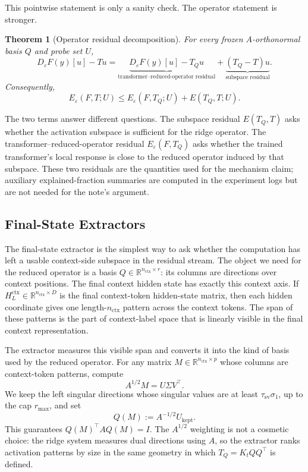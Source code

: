 \documentclass[11pt]{article}
\newtheorem{theorem}{Theorem}
\newcommand{\R}{\mathbb{R}}
\begin{document}
This pointwise statement is only a sanity check. The operator statement is stronger.

\begin{theorem}[Operator residual decomposition]
For every frozen \(A\)-orthonormal basis \(Q\) and probe set \(U\),
\[
D_\varepsilon F(y)[u]-Tu
=
\underbrace{D_\varepsilon F(y)[u]-T_Qu}_{\text{transformer--reduced-operator residual}}
+
\underbrace{(T_Q-T)u}_{\text{subspace residual}}.
\]
Consequently,
\[
E_\varepsilon(F,T;U)
\le
E_\varepsilon(F,T_Q;U)+E(T_Q,T;U).
\]
\end{theorem}

The two terms answer different questions. The subspace residual \(E(T_Q,T)\) asks whether the
activation subspace is sufficient for the ridge operator. The transformer--reduced-operator residual
\(E_\varepsilon(F,T_Q)\) asks whether the trained transformer's local response is close to the reduced
operator induced by that subspace. These two residuals are the quantities used for the mechanism
claim; auxiliary explained-fraction summaries are computed in the experiment logs but are not
needed for the note's argument.

\subsection{Final-State Extractors}

The final-state extractor is the simplest way to ask whether the computation has left a usable
context-side subspace in the residual stream. The object we need for the reduced operator is a
basis \(Q\in\R^{n_{\mathrm{ctx}}\times r}\): its columns are directions over context positions. The final
context hidden state has exactly this context axis. If \(H_L^{\mathrm{ctx}}\in\R^{n_{\mathrm{ctx}}\times D}\)
is the final context-token hidden-state matrix, then each hidden coordinate gives one
length-\(n_{\mathrm{ctx}}\) pattern across the context tokens. The span of these patterns is the part of
context-label space that is linearly visible in the final context representation.

The extractor measures this visible span and converts it into the kind of basis used by the
reduced operator. For any matrix \(M\in\R^{n_{\mathrm{ctx}}\times p}\) whose columns are context-token
patterns, compute
\[
A^{1/2}M=U\Sigma V^\top.
\]
We keep the left singular directions whose singular values are at least \(\tau_{\mathrm{sv}}\sigma_1\),
up to the cap \(r_{\max}\), and set
\[
Q(M):=A^{-1/2}U_{\mathrm{kept}}.
\]
This guarantees \(Q(M)^\top A Q(M)=I\). The \(A^{1/2}\) weighting is not a cosmetic choice: the
ridge system measures dual directions using \(A\), so the extractor ranks activation patterns by
size in the same geometry in which \(T_Q=K_tQQ^\top\) is defined.
\end{document}
